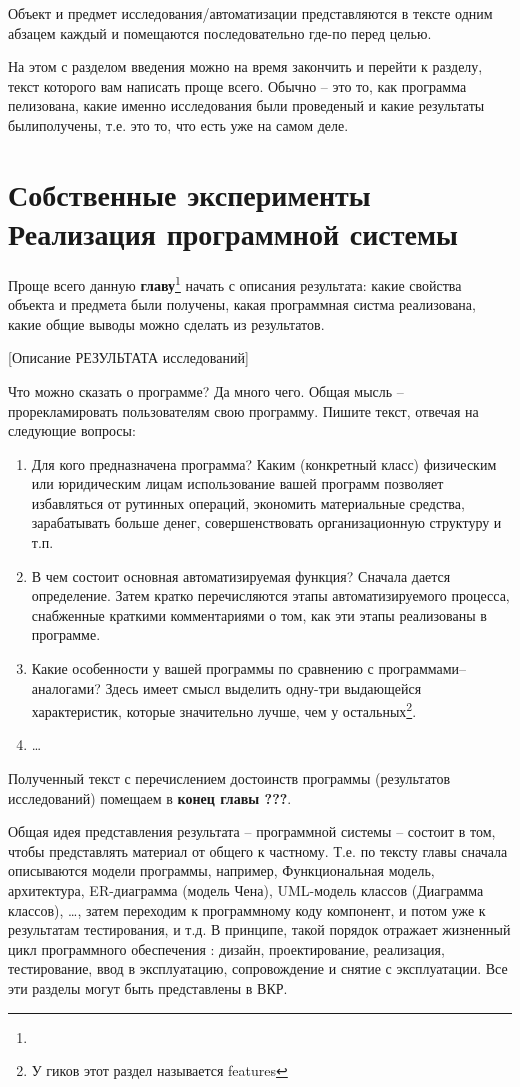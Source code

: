 \documentclass[a4paper,14pt,final]{extreport}
\begin{document}
Объект и предмет исследования/автоматизации представляются в тексте одним абзацем каждый и помещаются последовательно где-по перед целью.

На этом с разделом введения можно на время закончить и перейти к разделу, текст которого вам написать проще всего.  Обычно -- это то, как программа пелизована, какие именно исследования были проведеный и какие результаты былиполучены, т.е. это то, что есть уже на самом деле.

\section{Собственные эксперименты\\Реализация программной системы}

Проще всего данную \textbf{главу}\footnote{} начать с описания результата: какие свойства объекта и предмета были получены, какая программная систма реализована, какие общие выводы можно сделать из результатов.

[Описание РЕЗУЛЬТАТА исследований]

Что можно сказать о программе?  Да много чего.  Общая мысль -- прорекламировать пользователям свою программу.  Пишите текст, отвечая на следующие вопросы:
\begin{enumerate}
\item Для кого предназначена программа?  Каким (конкретный класс) физическим или юридическим лицам использование вашей программ позволяет избавляться от рутинных операций, экономить материальные средства, зарабатывать больше денег, совершенствовать организационную структуру и т.п.
\item В чем состоит основная автоматизируемая функция?  Сначала дается определение.  Затем кратко перечисляются этапы автоматизируемого процесса, снабженные краткими комментариями о том, как эти этапы реализованы в программе.
\item Какие особенности у вашей программы по сравнению с программами--аналогами?  Здесь имеет смысл выделить одну-три выдающейся характеристик, которые значительно лучше, чем у остальных\footnote{У гиков этот раздел называется features}.
\item \ldots
\end{enumerate}

Полученный текст с перечислением достоинств программы (результатов исследований) помещаем в \textbf{конец главы ???}.

Общая идея представления результата -- программной системы -- состоит в том, чтобы представлять материал от общего к частному.  Т.е. по тексту главы сначала описываются модели программы, например, Функциональная модель, архитектура, ER-диаграмма (модель Чена), UML-модель классов (Диаграмма классов), \ldots{}, затем переходим к программному коду компонент, и потом уже к результатам тестирования, и т.д.  В принципе, такой порядок отражает жизненный цикл программного обеспечения \cite{ZHC}: дизайн, проектирование, реализация, тестирование, ввод в эксплуатацию, сопровождение и снятие с эксплуатации.  Все эти разделы могут быть представлены в ВКР.
\end{document}

